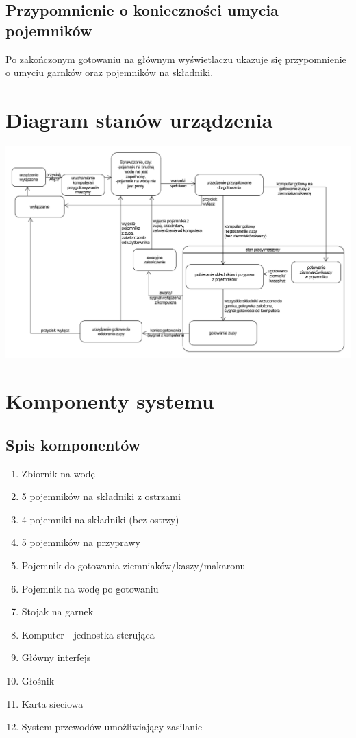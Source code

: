 \documentclass[12pt,a4paper,notitlepage]{article}
\begin{document}
\subsection{Przypomnienie o konieczności umycia pojemników}
Po zakończonym gotowaniu na głównym wyświetlaczu ukazuje się przypomnienie o umyciu garnków oraz pojemników na składniki.

\section{Diagram stanów urządzenia}

\includegraphics[scale=0.16,width=\textwidth,height=\textheight,keepaspectratio=true]{Diagram-stanow-urzadzenie.pdf}


\newpage
\section{Komponenty systemu}

\subsection{Spis komponentów}
\begin{enumerate}
  \item Zbiornik na wodę
  \item 5 pojemników na składniki z ostrzami
  \item 4 pojemniki na składniki (bez ostrzy)
  \item 5 pojemników na przyprawy
  \item Pojemnik do gotowania ziemniaków/kaszy/makaronu
  \item Pojemnik na wodę po gotowaniu
  \item Stojak na garnek
  \item Komputer - jednostka sterująca
  \item Główny interfejs
  \item Głośnik
  \item Karta sieciowa
  \item System przewodów umożliwiający zasilanie
\end{enumerate}
\end{document}
